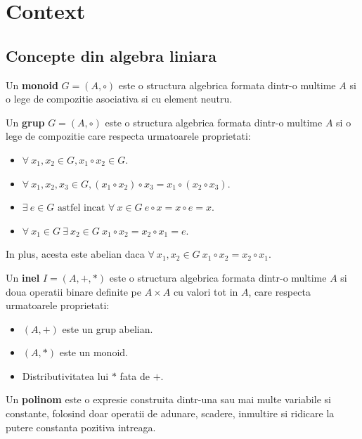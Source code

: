 \chapter{Context}

\section{Concepte din algebra liniara}

\begin{defn}
  Un \textbf{monoid} $G = (A, \circ)$ este o structura algebrica formata dintr-o
  multime $A$ si o lege de compozitie asociativa si cu element neutru.
\end{defn}

\begin{defn}
  Un \textbf{grup} $G = (A, \circ)$ este o structura algebrica formata dintr-o
  multime $A$ si o lege de compozitie care respecta urmatoarele proprietati:
  \begin{itemize}
      \item{$\forall\ x_{1}, x_{2} \in G, x_{1} \circ x_{2} \in G$.}
      \item{$\forall\ x_{1}, x_{2}, x_{3} \in G, (x_{1} \circ x_{2}) \circ x_{3} = x_{1} \circ (x_{2} \circ x_{3})$.}
      \item{$\exists\ e \in G \text{ astfel
      incat } \forall\ x \in G\ e \circ x = x \circ e = x$.}
      \item{$\forall\ x_{1} \in G\ \exists\ x_{2} \in G \ x_{1} \circ x_{2} = x_{2} \circ x_{1} = e$.}
  \end{itemize}
  In plus, acesta este abelian daca
  $\forall\ x_{1}, x_{2} \in G\ x_{1} \circ x_{2} = x_{2} \circ x_{1}$.
\end{defn}

\begin{defn}
  Un \textbf{inel} $I = (A, +, *)$ este o structura algebrica formata dintr-o
  multime $A$ si doua operatii binare definite pe $A \times A$ cu valori tot in
  $A$, care respecta urmatoarele proprietati:
  \begin{itemize}
      \item{$(A, +)$ este un grup abelian.}
      \item{$(A, *)$ este un monoid.}
      \item{Distributivitatea lui $*$ fata de $+$.}
  \end{itemize}
\end{defn}

\begin{defn}
  Un \textbf{polinom} este o expresie construita dintr-una sau mai multe
  variabile si constante, folosind doar operatii de adunare, scadere, inmultire
  si ridicare la putere constanta pozitiva intreaga.
\end{defn}

